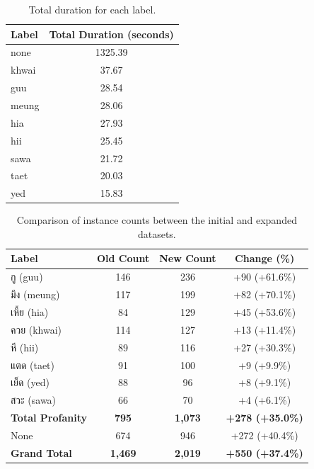 \documentclass[11pt]{article}
\newcommand{\textthai}[1]{{\thaifont #1}}
\begin{document}
\begin{table}[H]
    \caption{Total duration for each label.}
    \centering
    \label{tab:label-duration}
    \begin{tabular}{|l|c|}
        \hline
        \textbf{Label} & \textbf{Total Duration (seconds)} \\
        \hline
        none & 1325.39 \\
        khwai & 37.67 \\
        guu & 28.54 \\
        meung & 28.06 \\
        hia & 27.93 \\
        hii & 25.45 \\
        sawa & 21.72 \\
        taet & 20.03 \\
        yed & 15.83 \\
        \hline
    \end{tabular}
\end{table}

\begin{table}[H]
    \caption{Comparison of instance counts between the initial and expanded datasets.}
    \centering
    \label{tab:dataset-comparison}
    \footnotesize
    \begin{tabular}{|l|c|c|c|}
        \hline
        \textbf{Label} & \textbf{Old Count} & \textbf{New Count} & \textbf{Change (\%)} \\
        \hline
        \textthai{กู} (guu) & 146 & 236 & +90 (+61.6\%) \\
        \textthai{มึง} (meung) & 117 & 199 & +82 (+70.1\%) \\
        \textthai{เหี้ย} (hia) & 84 & 129 & +45 (+53.6\%) \\
        \textthai{ควย} (khwai) & 114 & 127 & +13 (+11.4\%) \\
        \textthai{หี} (hii) & 89 & 116 & +27 (+30.3\%) \\
        \textthai{แตด} (taet) & 91 & 100 & +9 (+9.9\%) \\
        \textthai{เย็ด} (yed) & 88 & 96 & +8 (+9.1\%) \\
        \textthai{สวะ} (sawa) & 66 & 70 & +4 (+6.1\%) \\
        \hline
        \textbf{Total Profanity} & \textbf{795} & \textbf{1,073} & \textbf{+278 (+35.0\%)} \\
        \hline
        None & 674 & 946 & +272 (+40.4\%) \\
        \hline
        \textbf{Grand Total} & \textbf{1,469} & \textbf{2,019} & \textbf{+550 (+37.4\%)} \\
        \hline
    \end{tabular}
\end{table}
\end{document}
